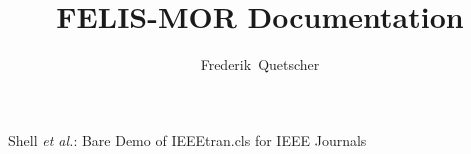 \documentclass[journal]{IEEEtran}
\begin{document}
%

\title{FELIS-MOR Documentation}
%
%

%

\author{Frederik~Quetscher}%


%
{Shell \MakeLowercase{\textit{et al.}}: Bare Demo of IEEEtran.cls for IEEE Journals}
% 

\newcommand{\diff}[1][V]{\ensuremath{\,\mathrm{d}{#1}}}
\newcommand{\tensor}[1]{\ensuremath{\mathbf{#1}}}
\newcommand{\transpose}[1]{\ensuremath{{#1}^\mathsf{T}}}
\newcommand{\hermite}[1]{\ensuremath{{#1}^\mathsf{H}}}
\newcommand{\curl}{\,\mathrm{curl}\,}
\renewcommand{\div}{\,\mathrm{div}\,}
\newcommand{\grad}{\,\mathrm{grad}\,}

\maketitle


\newcommand{\mbf}{\mathbf}
\newcommand{\mrm}{\mathrm}



\newcommand{\R}{\mathbb R}
\newcommand{\Cset}{\mathbb C}

\newcommand{\Pcal}{\mathcal P}

\newcommand{\Dc}{\mathcal D}

\newcommand{\setFRange}{d_f}

\newcommand{\setFRF}{\mathcal F} %
\newcommand{\setFRFApp}{\mathcal F^\mathrm{Appr}} %
\newcommand{\setFRFMapped}{\Fhat{\mathcal F}} %
\newcommand{\setFRFAppMapped}{\Fhat{\mathcal F^\mathrm{Appr}}} %

\newcommand{\setSim}{\mathcal A}%
\newcommand{\setApp}{\mathcal A^\mathrm{Appr}}
\newcommand{\setAppC}{\ul{\mathcal A}^\mathrm{Appr}}

\newcommand{\setFRFD}{\mathbf F} %
\newcommand{\setFRFAppD}{\mathbf F^\mathrm{Appr}} %
\end{document}
